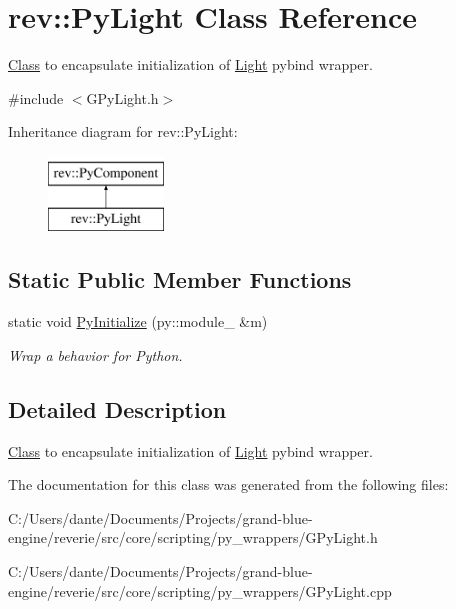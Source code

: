 \hypertarget{classrev_1_1_py_light}{}\section{rev\+::Py\+Light Class Reference}
\label{classrev_1_1_py_light}


\mbox{\hyperlink{struct_class}{Class}} to encapsulate initialization of \mbox{\hyperlink{classrev_1_1_light}{Light}} pybind wrapper.  




{\ttfamily \#include $<$G\+Py\+Light.\+h$>$}

Inheritance diagram for rev\+::Py\+Light\+:\begin{figure}[H]
\begin{center}
\leavevmode
\includegraphics[height=2.000000cm]{classrev_1_1_py_light}
\end{center}
\end{figure}
\subsection*{Static Public Member Functions}
\begin{DoxyCompactItemize}
\item 
\mbox{\label{classrev_1_1_py_light_a35f05ca3ad78dfd0e52712558d31f8b5}} 
static void \mbox{\hyperlink{classrev_1_1_py_light_a35f05ca3ad78dfd0e52712558d31f8b5}{Py\+Initialize}} (py\+::module\+\_\+ \&m)
\begin{DoxyCompactList}\small\item\em Wrap a behavior for Python. \end{DoxyCompactList}\end{DoxyCompactItemize}


\subsection{Detailed Description}
\mbox{\hyperlink{struct_class}{Class}} to encapsulate initialization of \mbox{\hyperlink{classrev_1_1_light}{Light}} pybind wrapper. 

The documentation for this class was generated from the following files\+:\begin{DoxyCompactItemize}
\item 
C\+:/\+Users/dante/\+Documents/\+Projects/grand-\/blue-\/engine/reverie/src/core/scripting/py\+\_\+wrappers/G\+Py\+Light.\+h\item 
C\+:/\+Users/dante/\+Documents/\+Projects/grand-\/blue-\/engine/reverie/src/core/scripting/py\+\_\+wrappers/G\+Py\+Light.\+cpp\end{DoxyCompactItemize}
